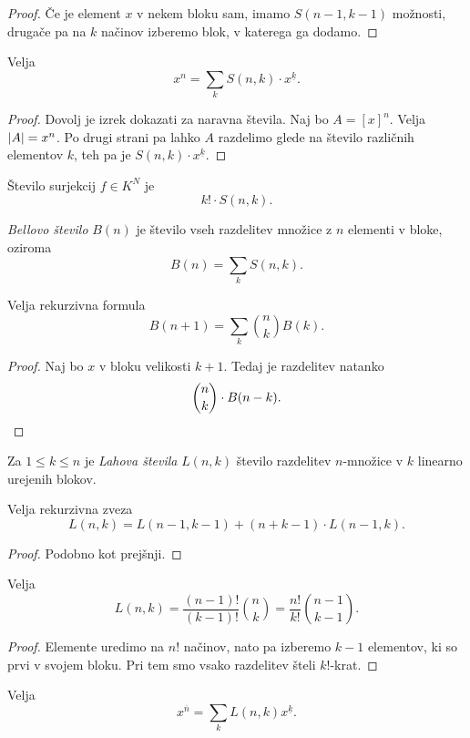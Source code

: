 \begin{proof}
Če je element $x$ v nekem bloku sam, imamo $S(n-1, k-1)$ možnosti,
drugače pa na $k$ načinov izberemo blok, v katerega ga dodamo.
\end{proof}

\begin{izrek}
Velja
\[
x^n = \sum_k S(n, k) \cdot x^{\underline{k}}.
\]
\end{izrek}

\begin{proof}
Dovolj je izrek dokazati za naravna števila. Naj bo $A = [x]^n$.
Velja $\left\lvert A\right\rvert = x^n$. Po drugi strani pa lahko $A$ razdelimo glede
na število različnih elementov $k$, teh pa je
$S(n,k) \cdot x^{\underline{k}}$.
\end{proof}

\begin{trditev}
Število surjekcij $f \in K^N$ je
\[
k! \cdot S(n, k).
\]
\end{trditev}

\obvs

\begin{definicija}
\emph{Bellovo število} $B(n)$ je število
vseh razdelitev množice z $n$ elementi v bloke, oziroma
\[
B(n) = \sum_k S(n, k).
\]
\end{definicija}

\begin{trditev}
Velja rekurzivna formula
\[
B(n+1) = \sum_k \binom{n}{k} B(k).
\]
\end{trditev}

\begin{proof}
Naj bo $x$ v bloku velikosti $k+1$. Tedaj je razdelitev natanko
\[
\binom{n}{k} \cdot B(n-k). \qedhere
\]
\end{proof}

\begin{definicija}
Za $1 \leq k \leq n$ je \emph{Lahova števila}
$L(n, k)$ število razdelitev $n$-množice v $k$ linearno urejenih
blokov.
\end{definicija}

\begin{trditev}
Velja rekurzivna zveza
\[
L(n, k) = L(n-1, k-1) + (n+k-1) \cdot L(n-1, k).
\]
\end{trditev}

\begin{proof}
Podobno kot prejšnji. %
\end{proof}

\begin{izrek}
Velja
\[
L(n, k) =
\frac{(n-1)!}{(k-1)!} \binom{n}{k} =
\frac{n!}{k!} \binom{n-1}{k-1}.
\]
\end{izrek}

\begin{proof}
Elemente uredimo na $n!$ načinov, nato pa izberemo $k-1$ elementov,
ki so prvi v svojem bloku. Pri tem smo vsako razdelitev šteli
$k!$-krat.
\end{proof}

\begin{izrek}
Velja
\[
x^{\overline{n}} = \sum_k L(n, k) x^{\underline{k}}.
\]
\end{izrek}
